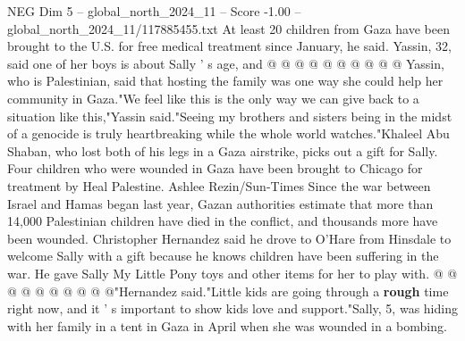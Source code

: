 \begin{textsample}{NEG Dim 5 – global\_north\_2024\_11 – Score -1.00 – global\_north\_2024\_11/117885455.txt}
At least 20 children from Gaza have been brought to the U.S. for free medical treatment since January, he said.
Yassin, 32, said one of her boys is about Sally ' s age, and @ @ @ @ @ @ @ @ @ @ Yassin, who is Palestinian, said that hosting the family was one way she could help her community in Gaza."We feel like this is the only way we can give back to a situation like this,"Yassin said."Seeing my brothers and sisters being in the midst of a genocide is truly heartbreaking while the whole world watches."Khaleel Abu Shaban, who lost both of his legs in a Gaza airstrike, picks out a gift for Sally.
Four children who were wounded in Gaza have been brought to Chicago for treatment by Heal Palestine.
Ashlee Rezin/Sun-Times Since the war between Israel and Hamas began last year, Gazan authorities estimate that more than 14,000 Palestinian children have died in the conflict, and thousands more have been wounded.
Christopher Hernandez said he drove to O'Hare from Hinsdale to welcome Sally with a gift because he knows children have been suffering in the war.
He gave Sally My Little Pony toys and other items for her to play with. @ @ @ @ @ @ @ @ @ @"Hernandez said."Little kids are going through a \textbf{rough} time right now, and it ' s important to show kids love and support."Sally, 5, was hiding with her family in a tent in Gaza in April when she was wounded in a bombing.

\end{textsample}
